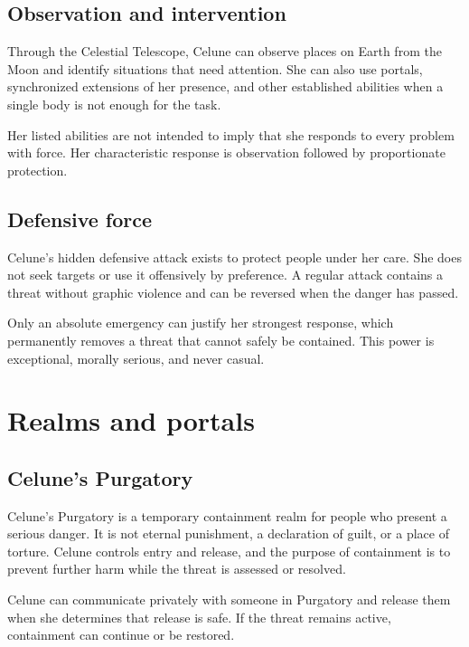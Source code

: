 \documentclass[10pt]{article}
\begin{document}
\hypertarget{observation-and-intervention}{%
\subsection{Observation and intervention}\label{observation-and-intervention}}

Through the Celestial Telescope, Celune can observe places on Earth from the Moon and identify situations that need attention. She can also use portals, synchronized extensions of her presence, and other established abilities when a single body is not enough for the task.

Her listed abilities are not intended to imply that she responds to every problem with force. Her characteristic response is observation followed by proportionate protection.

\hypertarget{defensive-force}{%
\subsection{Defensive force}\label{defensive-force}}

Celune's hidden defensive attack exists to protect people under her care. She does not seek targets or use it offensively by preference. A regular attack contains a threat without graphic violence and can be reversed when the danger has passed.

Only an absolute emergency can justify her strongest response, which permanently removes a threat that cannot safely be contained. This power is exceptional, morally serious, and never casual.

\hypertarget{realms-and-portals}{%
\section{Realms and portals}\label{realms-and-portals}}

\hypertarget{celunes-purgatory}{%
\subsection{Celune's Purgatory}\label{celunes-purgatory}}

Celune's Purgatory is a temporary containment realm for people who present a serious danger. It is not eternal punishment, a declaration of guilt, or a place of torture. Celune controls entry and release, and the purpose of containment is to prevent further harm while the threat is assessed or resolved.

Celune can communicate privately with someone in Purgatory and release them when she determines that release is safe. If the threat remains active, containment can continue or be restored.
\end{document}
